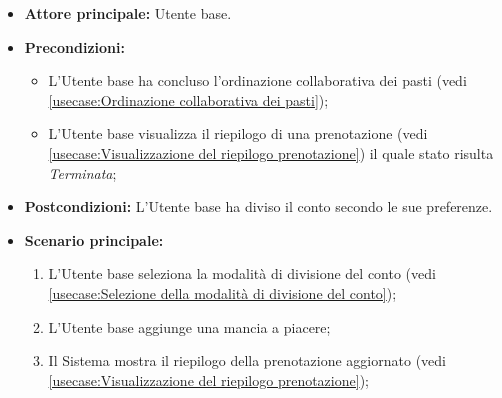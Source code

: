 \label{usecase:Divisione del conto}
\begin{itemize}
	\item \textbf{Attore principale:} Utente base.

	\item \textbf{Precondizioni:}  
	\begin{itemize}
		\item L'Utente base ha concluso l'ordinazione collaborativa dei pasti (vedi \autoref{usecase:Ordinazione collaborativa dei pasti});
		\item L'Utente base visualizza il riepilogo di una prenotazione (vedi \autoref{usecase:Visualizzazione del riepilogo prenotazione}) il quale stato risulta \textit{Terminata}; 
	\end{itemize}

	\item \textbf{Postcondizioni:} L'Utente base ha diviso il conto secondo le
	      sue preferenze.

	\item \textbf{Scenario principale:}
	      \begin{enumerate}
		      \item L'Utente base seleziona la modalità di divisione del conto
		            (vedi \autoref{usecase:Selezione della modalità di divisione del conto});

			 \item  L'Utente base aggiunge una mancia a piacere;

		      \item Il Sistema mostra il riepilogo della prenotazione aggiornato
		            (vedi \autoref{usecase:Visualizzazione del riepilogo prenotazione});

	      \end{enumerate}
\end{itemize}

